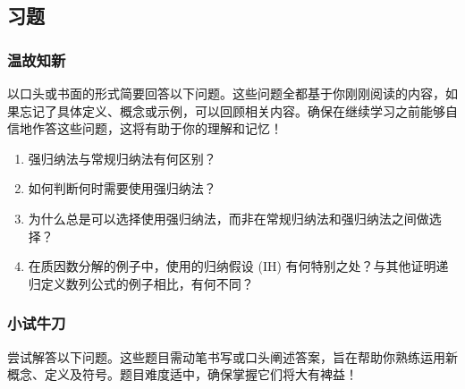 \subsection{习题}

\subsubsection*{温故知新}

以口头或书面的形式简要回答以下问题。这些问题全都基于你刚刚阅读的内容，如果忘记了具体定义、概念或示例，可以回顾相关内容。确保在继续学习之前能够自信地作答这些问题，这将有助于你的理解和记忆！

\begin{enumerate}[label=(\arabic*)]
    \item 强归纳法与常规归纳法有何区别？
    \item 如何判断何时需要使用强归纳法？
    \item 为什么总是可以选择使用强归纳法，而非在常规归纳法和强归纳法之间做选择？
    \item 在质因数分解的例子中，使用的归纳假设 (IH) 有何特别之处？与其他证明递归定义数列公式的例子相比，有何不同？
\end{enumerate}

\subsubsection*{小试牛刀}

尝试解答以下问题。这些题目需动笔书写或口头阐述答案，旨在帮助你熟练运用新概念、定义及符号。题目难度适中，确保掌握它们将大有裨益！

